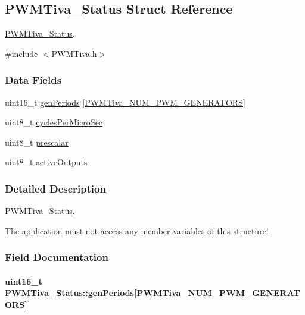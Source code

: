 \subsection{P\-W\-M\-Tiva\-\_\-\-Status Struct Reference}
\label{struct_p_w_m_tiva___status}


\hyperlink{struct_p_w_m_tiva___status}{P\-W\-M\-Tiva\-\_\-\-Status}.  




{\ttfamily \#include $<$P\-W\-M\-Tiva.\-h$>$}

\subsubsection*{Data Fields}
\begin{DoxyCompactItemize}
\item 
uint16\-\_\-t \hyperlink{struct_p_w_m_tiva___status_afe579c2bce8bcd75ca11ab5e2689ba33}{gen\-Periods} \mbox{[}\hyperlink{_p_w_m_tiva_8h_a3b71203004a2bad6632936ac4d7274de}{P\-W\-M\-Tiva\-\_\-\-N\-U\-M\-\_\-\-P\-W\-M\-\_\-\-G\-E\-N\-E\-R\-A\-T\-O\-R\-S}\mbox{]}
\item 
uint8\-\_\-t \hyperlink{struct_p_w_m_tiva___status_ab45856183a3fe6f2f350d49b9d60330e}{cycles\-Per\-Micro\-Sec}
\item 
uint8\-\_\-t \hyperlink{struct_p_w_m_tiva___status_a92fbd5e7351f2114f0403ca363eb51fb}{prescalar}
\item 
uint8\-\_\-t \hyperlink{struct_p_w_m_tiva___status_a7f5f9f86d8c0ddc3d90296fadf6e1133}{active\-Outputs}
\end{DoxyCompactItemize}


\subsubsection{Detailed Description}
\hyperlink{struct_p_w_m_tiva___status}{P\-W\-M\-Tiva\-\_\-\-Status}. 

The application must not access any member variables of this structure! 

\subsubsection{Field Documentation}
\paragraph[{gen\-Periods}]{\setlength{\rightskip}{0pt plus 5cm}uint16\-\_\-t P\-W\-M\-Tiva\-\_\-\-Status\-::gen\-Periods\mbox{[}{\bf P\-W\-M\-Tiva\-\_\-\-N\-U\-M\-\_\-\-P\-W\-M\-\_\-\-G\-E\-N\-E\-R\-A\-T\-O\-R\-S}\mbox{]}}\label{struct_p_w_m_tiva___status_afe579c2bce8bcd75ca11ab5e2689ba33}
